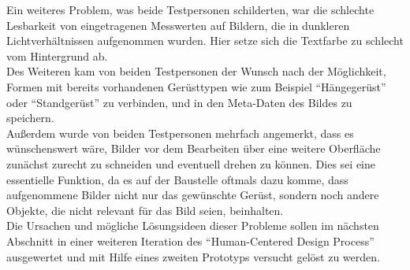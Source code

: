 Ein weiteres Problem, was beide Testpersonen schilderten, war die schlechte Lesbarkeit von eingetragenen Messwerten auf Bildern, die in dunkleren Lichtverhältnissen aufgenommen wurden.
Hier setze sich die Textfarbe zu schlecht vom Hintergrund ab. \\

Des Weiteren kam von beiden Testpersonen der Wunsch nach der Möglichkeit, Formen mit bereits vorhandenen Gerüsttypen wie zum Beispiel ``Hängegerüst'' oder ``Standgerüst'' zu verbinden, und in den Meta-Daten des Bildes zu speichern. \\

Außerdem wurde von beiden Testpersonen mehrfach angemerkt, dass es wünschenswert wäre, Bilder vor dem Bearbeiten über eine weitere Oberfläche zunächst zurecht zu schneiden und eventuell drehen zu können.
Dies sei eine essentielle Funktion, da es auf der Baustelle oftmals dazu komme, dass aufgenommene Bilder nicht nur das gewünschte Gerüst, sondern noch andere Objekte, die nicht relevant für das Bild seien, beinhalten. \\

Die Ursachen und mögliche Lösungsideen dieser Probleme sollen im nächsten Abschnitt in einer weiteren Iteration des ``Human-Centered Design Process'' ausgewertet und mit Hilfe eines zweiten Prototyps versucht gelöst zu werden.
